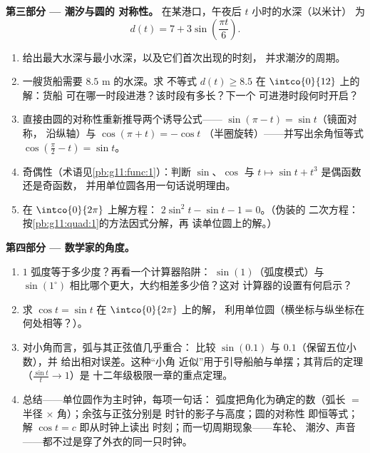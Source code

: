 \begin{problem}
\medskip
\noindent\textbf{第三部分 --- 潮汐与圆的
对称性。}
在某港口，午夜后 $t$ 小时的水深（以米计）
为
\[
d(t) = 7 + 3 \sin\!\left(\frac{\pi t}{6}\right).
\]
\begin{enumerate}[resume]
  \item 给出最大水深与最小水深，以及它们首次出现的时刻，
        并求潮汐的周期。
  \item 一艘货船需要 $8.5$ m 的水深。求
        不等式 $d(t) \geq 8.5$ 在 $\intco{0}{12}$ 上的解：货船
        可在哪一时段进港？该时段有多长？下一个
        可进港时段何时开启？
  \item 直接由圆的对称性重新推导两个诱导公式——
        $\sin(\pi - t) = \sin t$（镜面对称，
        沿纵轴）与 $\cos(\pi + t) = -\cos t$
        （半圈旋转）——并写出余角恒等式
        $\cos\left(\frac\pi2 - t\right) = \sin t$。
  \item 奇偶性（术语见\cref{pb:g11:func:1}）：判断
        $\sin$、$\cos$ 与 $t \mapsto \sin t + t^3$ 是偶函数还是奇函数，
        并用单位圆各用一句话说明理由。
  \item 在 $\intco{0}{2\pi}$ 上解方程：
        $2\sin^2 t - \sin t - 1 = 0$。（伪装的
        二次方程：按\cref{pb:g11:quad:1}的方法因式分解，再
        读单位圆上的解。）
\end{enumerate}

\medskip
\noindent\textbf{第四部分 --- 数学家的角度。}
\begin{enumerate}[resume]
  \item $1$ 弧度等于多少度？再看一个计算器陷阱：
        $\sin(1)$（弧度模式）与
        $\sin(1^\circ)$ 相比哪个更大，大约相差多少倍？这对
        计算器的设置有何启示？
  \item 求 $\cos t = \sin t$ 在 $\intco{0}{2\pi}$ 上的解，
        利用单位圆（横坐标与纵坐标在何处相等？）。
  \item 对小角而言，弧与其正弦值几乎重合：
        比较 $\sin(0.1)$ 与 $0.1$（保留五位小数），并
        给出相对误差。这种“小角
        近似”用于引导船舶与单摆；其背后的定理
        （$\frac{\sin t}{t} \to 1$）是
        十二年级极限一章的重点定理。
  \item 总结——单位圆作为主时钟，每项一句话：
        弧度把角化为确定的数（弧长
        $=$ 半径 $\times$ 角）；余弦与正弦分别是
        时针的影子与高度；圆的对称性
        即恒等式；解 $\cos t = c$ 即从时钟上读出
        时刻；而一切周期现象——车轮、
        潮汐、声音——都不过是穿了外衣的同一只时钟。
\end{enumerate}
\end{problem}
